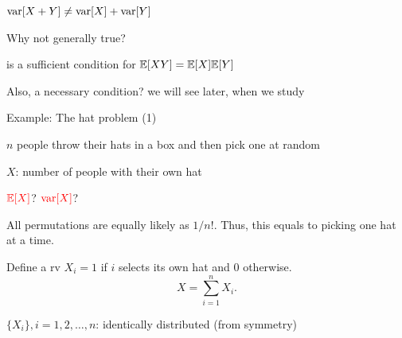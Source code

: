 \begin{frame}{$\text{var}[ X + Y ] \neq \text{var}[ X ] + \text{var}[ Y ]$}

\plitemsep 0.1in
\bci [$\circ$]

\item<1-> Why not generally true?


\item<3->  is a sufficient condition for $\mathbb{E}[ XY ] = \mathbb{E}[ X ]\mathbb{E}[ Y ]$ 

\item<5-> Also, a necessary condition? we will see later, when we study  
\eci

\end{frame}

\begin{frame}{Example: The hat problem (1)}

\plitemsep 0.1in
\bci 
\item<1-> $n$ people throw their hats in a box and then pick one at random

\item<1-> $X$: number of people with their own hat

\item<2->  ${\color{red} \mathbb{E}[ X ]}$? ${\color{red} \text{var}[ X ]}$?

\item<3-> All permutations are equally likely as $1/n!.$ Thus, this equals to picking one hat at a time.

\item<4->  Define a rv $X_i=1$ if $i$ selects its own hat and $0$ otherwise. 
$$X = \sum_{i=1}^n X_i.$$

\item<5-> $\{X_i\}, i=1, 2, \ldots, n$: identically distributed (from symmetry)



\eci
\end{frame}

